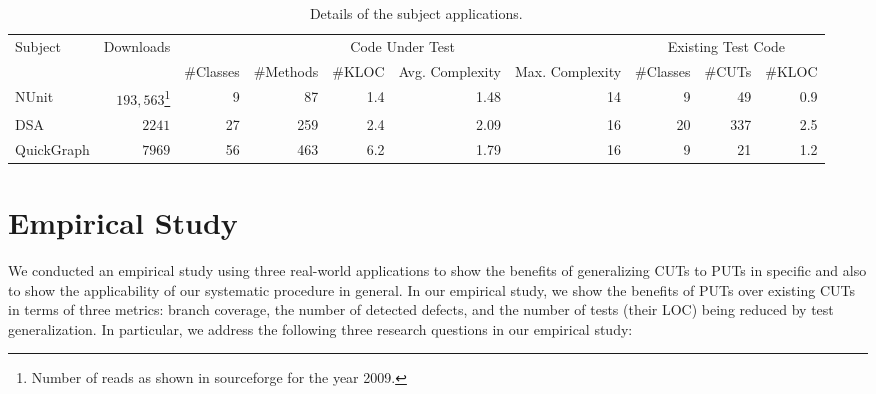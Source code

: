 \begin{table*}[t]%
\centering
\begin{minipage}{\textwidth}
\centering
\begin{tabular}{|l|r|r|r|r|r|r|r|r|r|}
\hline
Subject 		& Downloads 	& \multicolumn{5}{|c|}{Code Under Test} 															&	\multicolumn{3}{|c|}{Existing Test Code} 	\\ \cline{3-10}
						& 						&	\#Classes	&	\#Methods	& \#KLOC	& Avg. Complexity & Max. Complexity	&	\#Classes	&	\#CUTs	 	&	\#KLOC						\\ \hline\hline
NUnit				&		$193,563$\footnote{Number of reads as shown in sourceforge for the year 2009.}
													&	9					&	87  			&		1.4		&				1.48 			& 14 							&			9			&			49		&		0.9							\\ \hline
DSA					&		$2241$		&	27  			&	259 			&		2.4		&				2.09 			& 16							&			20		&			337		&		2.5							\\ \hline		
QuickGraph	&		$7969$ 		&	56				&	463				&		6.2		&				1.79			& 16							&			9			&			21		&		1.2							\\ \hline
\end{tabular}
\end{minipage} \vspace*{-3ex}
\caption{Details of the subject applications.} \vspace*{-3ex}
\label{tab:subjectmetrics}
\end{table*} 

\section{Empirical Study}
\label{sec:study}

We conducted an empirical study using three real-world applications to show the benefits of generalizing CUTs to PUTs in specific and also to show the applicability of our systematic procedure in general. In our empirical study, we show the benefits of PUTs over existing CUTs in terms of three metrics: branch coverage, the number of detected defects, and the number of tests (their LOC) being reduced by test generalization. In particular, we address the following three research questions in our empirical study:

